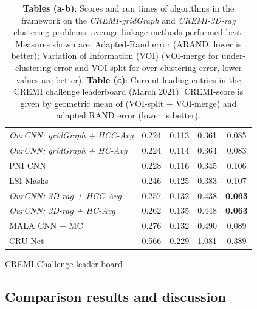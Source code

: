 \begin{table}[t]
\begin{subtable}[t]{.38\textwidth}
\begin{tabular}[t]{lcccc}
\emph{OurCNN: gridGraph + HCC-Avg} & 0.224 & 0.113 & 0.361 & 0.085  \\
\emph{OurCNN: gridGraph + HC-Avg}  & 0.224 & 0.114 &  0.364 & 0.083 \\
PNI CNN \cite{lee2017superhuman} & 0.228 & 0.116 & 0.345 & 0.106 \\
LSI-Masks \cite{bailoni2020proposal}  & 0.246 & 0.125 & 0.383 & 0.107  \\
\emph{OurCNN: 3D-rag + HCC-Avg} & 0.257 & 0.132 & 0.438& \textbf{0.063} \\  
\emph{OurCNN: 3D-rag + HC-Avg} & 0.262 & 0.135 & 0.448 & \textbf{0.063}   \\  
MALA CNN + MC \cite{funke2018large} & 0.276  & 0.132 &0.490  & 0.089  \\
CRU-Net \cite{zeng2017deepem3d} & 0.566 & 0.229 & 1.081 &  0.389    \\
        \end{tabular}
        \caption{CREMI Challenge leader-board}
        \label{tab:cremi_leaderboard}
        \end{subtable}
    \caption{\textbf{Tables (a-b)}: Scores and run times of algorithms in the \algname{} framework on the \emph{CREMI-gridGraph} and \emph{CREMI-3D-rag} clustering problems: average linkage methods performed best. Measures shown are: Adapted-Rand error (ARAND, lower is better); Variation of Information (VOI) \cite{arganda2015crowdsourcing} (VOI-merge for under-clustering error and VOI-split for over-clustering error, lower values are better). \textbf{Table (c)}: Current leading entries in the CREMI challenge leaderboard (March 2021). CREMI-score is given by geometric mean of (VOI-split + VOI-merge)  and adapted RAND error (lower is better).}
    \label{tab:scores}
\end{table}

\subsection{Comparison results and discussion}\label{sec:experiments_discussion}

